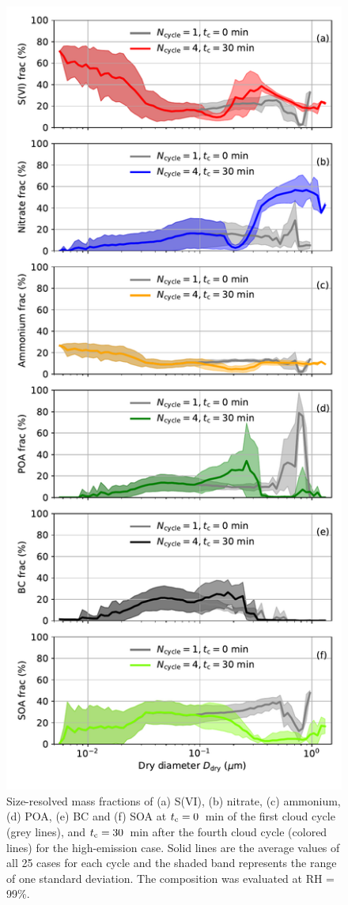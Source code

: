 \documentclass[edeposit,fullpage]{uiucthesis2009}
\begin{document}
\begin{figure}
    \centering
    \includegraphics[scale=0.60]{chap3_figs/fig6.pdf}
    \caption{Size-resolved mass fractions of (a) S(VI), (b) nitrate,
      (c) ammonium, (d) POA, (e) BC and (f) SOA at $t_{\rm c}=0$~min
      of the first cloud cycle (grey lines), and $t_{\rm c}=30$~min
      after the fourth cloud cycle (colored lines) for the
        high-emission case.  Solid lines are the average values of
      all 25 cases for each cycle and the shaded band represents the
      range of one standard deviation. The composition was
        evaluated at RH = 99\%.}
    \label{fig:size_mass}
\end{figure}
\end{document}
